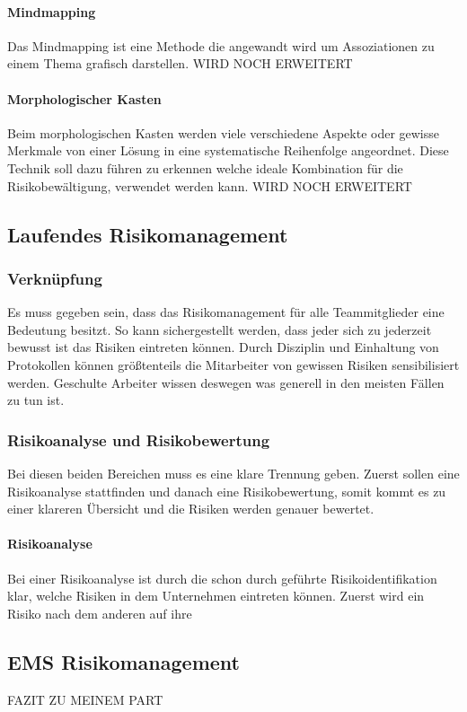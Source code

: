 \paragraph{Mindmapping}
Das Mindmapping ist eine Methode die angewandt wird um Assoziationen zu einem Thema grafisch darstellen.
WIRD NOCH ERWEITERT

\paragraph{Morphologischer Kasten}
Beim morphologischen Kasten werden viele verschiedene Aspekte oder gewisse Merkmale von einer Lösung in eine systematische Reihenfolge angeordnet. Diese Technik soll dazu führen zu erkennen welche ideale Kombination für die Risikobewältigung, verwendet werden kann.
WIRD NOCH ERWEITERT

\subsection{Laufendes Risikomanagement}
\subsubsection{Verknüpfung}
Es muss gegeben sein, dass das Risikomanagement für alle Teammitglieder eine Bedeutung besitzt. So kann sichergestellt werden, dass jeder sich zu jederzeit bewusst ist das Risiken eintreten können. Durch Disziplin und Einhaltung von Protokollen können größtenteils die Mitarbeiter von gewissen Risiken sensibilisiert werden. Geschulte Arbeiter wissen deswegen was generell in den meisten Fällen zu tun ist.

\subsubsection{Risikoanalyse und Risikobewertung}
Bei diesen beiden Bereichen muss es eine klare Trennung geben. Zuerst sollen eine Risikoanalyse stattfinden und danach eine Risikobewertung, somit kommt es zu einer klareren Übersicht und die Risiken werden genauer bewertet.

\paragraph{Risikoanalyse}
Bei einer Risikoanalyse ist durch die schon durch geführte Risikoidentifikation klar, welche Risiken in dem Unternehmen eintreten können. Zuerst wird ein Risiko nach dem anderen auf ihre 


\subsection{EMS Risikomanagement}
FAZIT ZU MEINEM PART